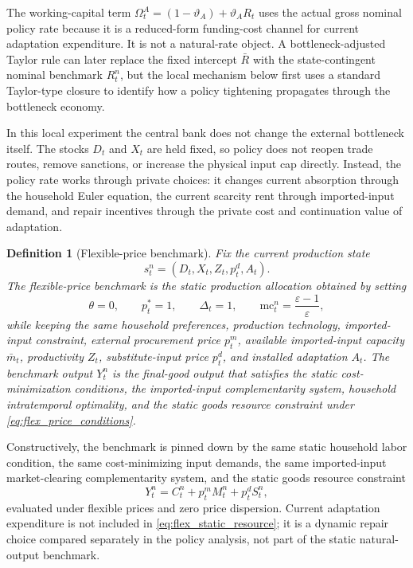 ﻿\documentclass[12pt]{article}
\newtheorem{definition}{Definition}
\theoremstyle{remark}
\newcommand{\mc}{\mathrm{mc}}
\begin{document}
The working-capital term $\Omega_t^A=(1-\vartheta_A)+\vartheta_A R_t$ uses the actual gross
nominal policy rate because it is a reduced-form funding-cost channel for current adaptation
expenditure. It is not a natural-rate object. A bottleneck-adjusted Taylor rule can later replace
the fixed intercept $\bar R$ with the state-contingent nominal benchmark $R_t^n$, but the local
mechanism below first uses a standard Taylor-type closure to identify how a policy tightening
propagates through the bottleneck economy.

In this local experiment the central bank does not change the external bottleneck itself. The
stocks $D_t$ and $X_t$ are held fixed, so policy does not reopen trade routes, remove sanctions, or
increase the physical input cap directly. Instead, the policy rate works through private choices:
it changes current absorption through the household Euler equation, the current scarcity rent
through imported-input demand, and repair incentives through the private cost and continuation
value of adaptation.

\begin{definition}[Flexible-price benchmark]\label{def:flex_benchmark}
Fix the current production state
\[
    s_t^n=(D_t,X_t,Z_t,p_t^d,A_t).
\]
The flexible-price benchmark is the static production allocation obtained by setting
\begin{equation}
    \theta=0,
    \qquad
    p_t^*=1,
    \qquad
    \Delta_t=1,
    \qquad
    \mc_t^n=\frac{\varepsilon-1}{\varepsilon},
    \label{eq:flex_price_conditions}
\end{equation}
while keeping the same household preferences, production technology, imported-input constraint,
external procurement price $p_t^m$, available imported-input capacity $\bar m_t$, productivity
$Z_t$, substitute-input price $p_t^d$, and installed adaptation $A_t$. The benchmark output
$Y_t^n$ is the final-good output that satisfies the static cost-minimization conditions, the
imported-input complementarity system, household intratemporal optimality, and the static goods
resource constraint under \eqref{eq:flex_price_conditions}.
\end{definition}

Constructively, the benchmark is pinned down by the same static household labor condition, the
same cost-minimizing input demands, the same imported-input market-clearing complementarity
system, and the static goods resource constraint
\begin{equation}
    Y_t^n
    =
    C_t^n
    +
    p_t^mM_t^n
    +
    p_t^dS_t^n,
    \label{eq:flex_static_resource}
\end{equation}
evaluated under flexible prices and zero price dispersion. Current adaptation expenditure is not
included in \eqref{eq:flex_static_resource}; it is a dynamic repair choice compared separately in
the policy analysis, not part of the static natural-output benchmark.
\end{document}
